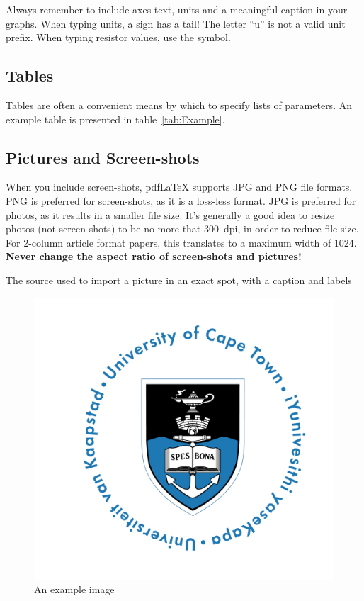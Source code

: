Always remember to include axes text, units and a meaningful caption in your graphs.  When typing units, a \micro{} sign has a tail!  The letter ``u'' is not a valid unit prefix.  When typing resistor values, use the \Ohm{} symbol.

\subsection{Tables}
Tables are often a convenient means by which to specify lists of parameters.  An example table is presented in table~\ref{tab:Example}.


\subsection{Pictures and Screen-shots}
When you include screen-shots, pdf\LaTeX{} supports JPG and PNG file formats.  PNG is preferred for screen-shots, as it is a loss-less format.  JPG is preferred for photos, as it results in a smaller file size.  It's generally a good idea to resize photos (not screen-shots) to be no more that 300~dpi, in order to reduce file size.  For 2-column article format papers, this translates to a maximum width of 1024.  \textbf{Never change the aspect ratio of screen-shots and pictures!}

The source used to import a picture in an exact spot, with a caption and labels

\begin{figure}[H]
\centering
\includegraphics[width=0.6\columnwidth]{Figures/UCT}
\caption{An example image}
\label{fig:imageExample}
\end{figure}

